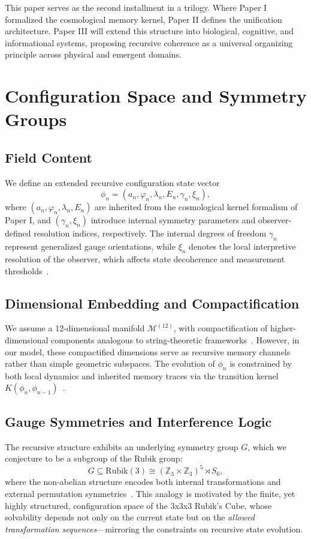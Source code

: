 \documentclass[11pt]{article}
\begin{document}
This paper serves as the second installment in a trilogy. Where Paper I formalized the cosmological memory kernel, Paper II defines the unification architecture. Paper III will extend this structure into biological, cognitive, and informational systems, proposing recursive coherence as a universal organizing principle across physical and emergent domains.


\section{Configuration Space and Symmetry Groups}

\subsection{Field Content}

We define an extended recursive configuration state vector
\[
\phi_n = \left( a_n, \varphi_n, \lambda_n, E_n, \gamma_n, \xi_n \right),
\]
where $(a_n, \varphi_n, \lambda_n, E_n)$ are inherited from the cosmological kernel formalism of Paper I, and $(\gamma_n, \xi_n)$ introduce internal symmetry parameters and observer-defined resolution indices, respectively. The internal degrees of freedom $\gamma_n$ represent generalized gauge orientations, while $\xi_n$ denotes the local interpretive resolution of the observer, which affects state decoherence and measurement thresholds~\cite{zurek2003decoherence, nielsen2010quantum}.

\subsection{Dimensional Embedding and Compactification}

We assume a 12-dimensional manifold $\mathcal{M}^{(12)}$, with compactification of higher-dimensional components analogous to string-theoretic frameworks~\cite{peskin1995introduction}. However, in our model, these compactified dimensions serve as recursive memory channels rather than simple geometric subspaces. The evolution of $\phi_n$ is constrained by both local dynamics and inherited memory traces via the transition kernel $K(\phi_{n}, \phi_{n-1})$~\cite{ashtekar2006quantum}.

\subsection{Gauge Symmetries and Interference Logic}

The recursive structure exhibits an underlying symmetry group $G$, which we conjecture to be a subgroup of the Rubik group:
\[
G \subseteq \text{Rubik}(3) \cong ( \mathbb{Z}_3 \times \mathbb{Z}_3 )^5 \rtimes S_6,
\]
where the non-abelian structure encodes both internal transformations and external permutation symmetries~\cite{joyner2008adventures}. This analogy is motivated by the finite, yet highly structured, configuration space of the 3x3x3 Rubik’s Cube, whose solvability depends not only on the current state but on the \textit{allowed transformation sequences}—mirroring the constraints on recursive state evolution.
\end{document}
